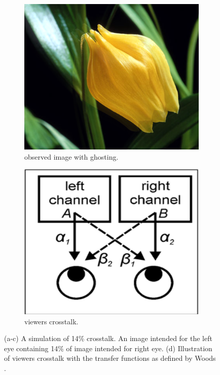\begin{figure}[htbp]
    \begin{subfigure}[t]{0.3\textwidth}
        \includegraphics[width=\textwidth]{./Template_Figures/crosstalk}
        \caption{observed image with ghosting.}\label{fig:imWCT}
    \end{subfigure}
    \begin{subfigure}[t]{0.3\textwidth}
        \includegraphics[width=\textwidth]{./Template_Figures/viewerCT}
        \caption{viewers crosstalk.}\label{fig:viewerCT}
    \end{subfigure}

    \caption{(a-c) A simulation of 14\% crosstalk. An image intended for the left eye containing 14\% of image intended for right eye. (d) Illustration of viewers crosstalk with the transfer functions as defined by Woods \cite{woods2012crosstalk}. \label{fig:ct1}}
\end{figure}

